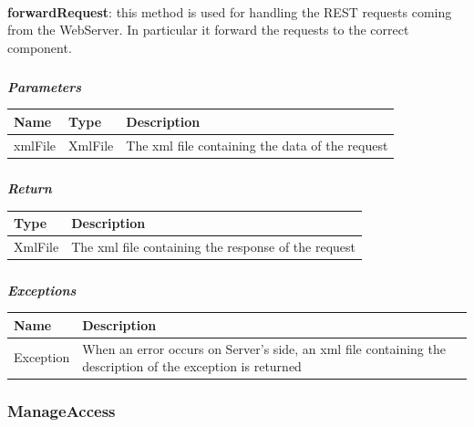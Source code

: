 					\paragraph{}
							\textbf{forwardRequest}: this method is used for handling the REST requests coming from the WebServer. In particular it forward the requests to the correct component.
							\subparagraph{}
							\textit{\textbf{Parameters}}
								\begin{table}[!h]
									\begin{tabular}{L{0.2\textwidth}L{0.2\textwidth}L{0.2\textwidth}}
										\toprule
										Name & Type & Description \\
										\midrule
								  		xmlFile & XmlFile & The xml file containing the data of the request  \\
								 		\bottomrule
									\end{tabular}
								\end{table}
							\subparagraph{}
								\textit{\textbf{Return}}
									\begin{table}[!h]
									\begin{tabular}{L{0.3\textwidth}L{0.3\textwidth}}
										\toprule
										Type & Description \\
										\midrule
								  		XmlFile & The xml file containing the response of the request \\
								 		\bottomrule
									\end{tabular}
								\end{table}
							\subparagraph{}
								\textit{\textbf{Exceptions}}
									\begin{table}[!h]
									\begin{tabular}{L{0.3\textwidth}L{0.3\textwidth}}
										\toprule
										Name & Description \\
										\midrule
								  		Exception & When an error occurs on Server's side, an xml file containing the description of the exception is returned \\
								 		\bottomrule
									\end{tabular}
								\end{table}
						
				\subsubsection{ManageAccess}
